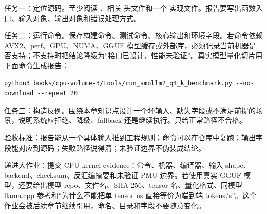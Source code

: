 任务一：定位源码。至少阅读 、相关  头文件和一个  实现文件。报告要写出函数入口、输入对象、输出对象和错误处理方式。

任务二：运行命令。保存构建命令、测试命令、核心输出和环境字段。若命令依赖 AVX2、perf、GPU、NUMA、GGUF 模型缓存或外部库，必须记录当前机器是否支持；不支持时把结论降级为“接口已设计，性能未验证”。真实模型量化切片用下面命令生成报告：

\begin{lstlisting}[numbers=none,caption={SmolLM2 Q4\_K 单算子证据入口}]
python3 books/cpu-volume-3/tools/run_smollm2_q4_k_benchmark.py --no-download --repeat 20
\end{lstlisting}

任务三：构造反例。围绕本章知识点设计一个坏输入、缺失字段或不满足前提的场景，说明系统应拒绝、降级、fallback 还是继续执行。只给正常路径不合格。


验收标准：报告能从一个具体输入推到工程规则；命令可以在仓库中复跑；输出字段能对应到源码；失败路径说得清；未验证边界不伪装成结论。

递进大作业：提交 CPU kernel evidence：命令、机器、编译器、输入 shape、backend、checksum、反汇编摘要和未验证 PMU 边界。若使用真实 GGUF 模型，还要给出模型 repo、文件名、SHA-256、tensor 名、量化格式、同模型 llama.cpp 参考和“为什么不能把单 tensor us 直接等价为端到端 tokens/s”。这个作业会被后续章节继续引用，命名、目录和字段不要随意变化。

